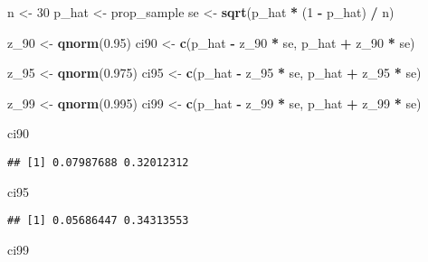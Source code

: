 \documentclass[
]{article}
\newenvironment{Shaded}{\begin{snugshade}}{\end{snugshade}}
\newcommand{\DecValTok}[1]{\textcolor[rgb]{0.00,0.00,0.81}{#1}}
\newcommand{\FloatTok}[1]{\textcolor[rgb]{0.00,0.00,0.81}{#1}}
\newcommand{\FunctionTok}[1]{\textcolor[rgb]{0.13,0.29,0.53}{\textbf{#1}}}
\newcommand{\NormalTok}[1]{#1}
\newcommand{\OtherTok}[1]{\textcolor[rgb]{0.56,0.35,0.01}{#1}}
\newcommand{\SpecialCharTok}[1]{\textcolor[rgb]{0.81,0.36,0.00}{\textbf{#1}}}
\begin{document}
\begin{Shaded}
\begin{Highlighting}[]
\NormalTok{n }\OtherTok{\textless{}{-}} \DecValTok{30}
\NormalTok{p\_hat }\OtherTok{\textless{}{-}}\NormalTok{ prop\_sample}
\NormalTok{se }\OtherTok{\textless{}{-}} \FunctionTok{sqrt}\NormalTok{(p\_hat }\SpecialCharTok{*}\NormalTok{ (}\DecValTok{1} \SpecialCharTok{{-}}\NormalTok{ p\_hat) }\SpecialCharTok{/}\NormalTok{ n)}

\NormalTok{z\_90 }\OtherTok{\textless{}{-}} \FunctionTok{qnorm}\NormalTok{(}\FloatTok{0.95}\NormalTok{)}
\NormalTok{ci90 }\OtherTok{\textless{}{-}} \FunctionTok{c}\NormalTok{(p\_hat }\SpecialCharTok{{-}}\NormalTok{ z\_90 }\SpecialCharTok{*}\NormalTok{ se, p\_hat }\SpecialCharTok{+}\NormalTok{ z\_90 }\SpecialCharTok{*}\NormalTok{ se)}

\NormalTok{z\_95 }\OtherTok{\textless{}{-}} \FunctionTok{qnorm}\NormalTok{(}\FloatTok{0.975}\NormalTok{)}
\NormalTok{ci95 }\OtherTok{\textless{}{-}} \FunctionTok{c}\NormalTok{(p\_hat }\SpecialCharTok{{-}}\NormalTok{ z\_95 }\SpecialCharTok{*}\NormalTok{ se, p\_hat }\SpecialCharTok{+}\NormalTok{ z\_95 }\SpecialCharTok{*}\NormalTok{ se)}

\NormalTok{z\_99 }\OtherTok{\textless{}{-}} \FunctionTok{qnorm}\NormalTok{(}\FloatTok{0.995}\NormalTok{)}
\NormalTok{ci99 }\OtherTok{\textless{}{-}} \FunctionTok{c}\NormalTok{(p\_hat }\SpecialCharTok{{-}}\NormalTok{ z\_99 }\SpecialCharTok{*}\NormalTok{ se, p\_hat }\SpecialCharTok{+}\NormalTok{ z\_99 }\SpecialCharTok{*}\NormalTok{ se)}

\NormalTok{ci90}
\end{Highlighting}
\end{Shaded}

\begin{verbatim}
## [1] 0.07987688 0.32012312
\end{verbatim}

\begin{Shaded}
\begin{Highlighting}[]
\NormalTok{ci95}
\end{Highlighting}
\end{Shaded}

\begin{verbatim}
## [1] 0.05686447 0.34313553
\end{verbatim}

\begin{Shaded}
\begin{Highlighting}[]
\NormalTok{ci99}
\end{Highlighting}
\end{Shaded}
\end{document}
